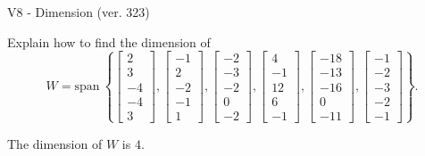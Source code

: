 \begin{exercise}
  \begin{exerciseTitle}V8 - Dimension (ver. 323)\end{exerciseTitle}
  \begin{exerciseStatement}
    Explain how to find the dimension of 
\[W=\mathrm{span}\ \left\{\left[\begin{array}{r}
2 \\
3 \\
-4 \\
-4 \\
3
\end{array}\right] , \left[\begin{array}{r}
-1 \\
2 \\
-2 \\
-1 \\
1
\end{array}\right] , \left[\begin{array}{r}
-2 \\
-3 \\
-2 \\
0 \\
-2
\end{array}\right] , \left[\begin{array}{r}
4 \\
-1 \\
12 \\
6 \\
-1
\end{array}\right] , \left[\begin{array}{r}
-18 \\
-13 \\
-16 \\
0 \\
-11
\end{array}\right] , \left[\begin{array}{r}
-1 \\
-2 \\
-3 \\
-2 \\
-1
\end{array}\right]\right\}.\]



  \end{exerciseStatement}
  \begin{exerciseAnswer}
   The dimension of \(W\) is  \(4\).
  


  \end{exerciseAnswer}
\end{exercise}